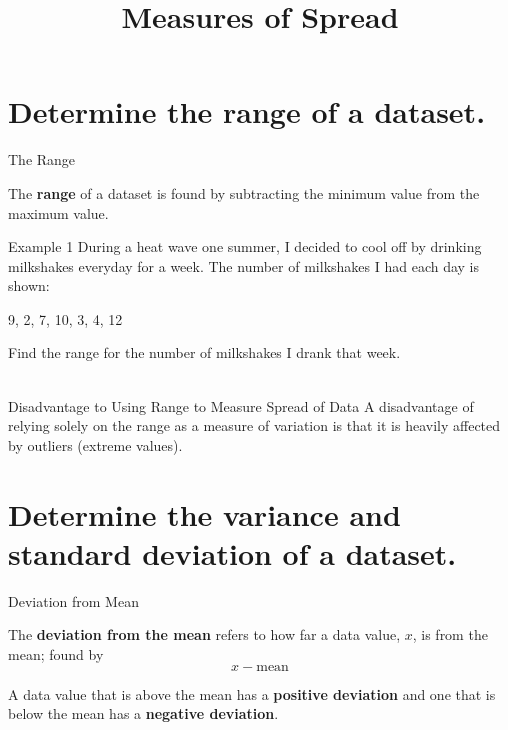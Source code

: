 \documentclass[t]{beamer}
\title{Measures of Spread}
\author{}
\date{}
\begin{document}
\begin{frame} 
\maketitle
\end{frame}


\section{Determine the range of a dataset.}

\begin{frame}{The Range}
\begin{tcolorbox}[colframe=green!20!black, colback = green!30!white,title=\textbf{Range}]
The \textbf{range} of a dataset is found by subtracting the minimum value from the maximum value.
\end{tcolorbox}
\end{frame}

\begin{frame}{Example 1}
During a heat wave one summer, I decided to cool off by drinking milkshakes everyday for a week. The number of milkshakes I had each day is shown:	
\begin{center}
9, 2, 7, 10, 3, 4, 12
\end{center}

Find the range for the number of milkshakes I drank that week.	\newline\\
	\quad	{}	\newline\\
\end{frame}

\begin{frame}{Disadvantage to Using Range to Measure Spread of Data}
A disadvantage of relying solely on the range as a measure of variation is that it is heavily affected by outliers (extreme values).
\end{frame}

\section{Determine the variance and standard deviation of a dataset.}

\begin{frame}{Deviation from Mean}
\begin{tcolorbox}[colframe=green!20!black, colback = green!30!white,title=\textbf{Deviation from the Mean}]
The \textbf{deviation from the mean} refers to how far a data value, $x$, is from the mean; found by \[x - \text{mean}\]
\end{tcolorbox}
\vspace{11pt}	\pause

A data value that is above the mean has a {\color{blue}\textbf{positive deviation}} and one that is below the mean has a {\color{red}\textbf{negative deviation}}.
\end{frame}
\end{document}
